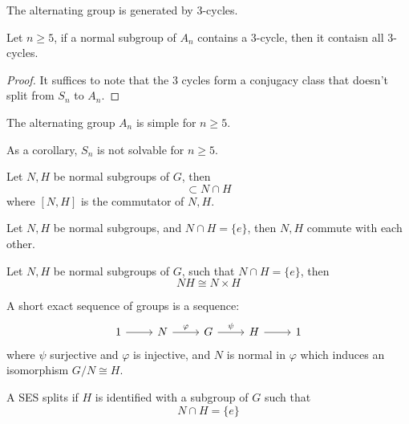 \documentclass[openany]{book}
\begin{document}
\begin{prop}
    The alternating group is generated by $3$-cycles.
\end{prop}

\begin{prop}
    Let $n\geq 5$, if a normal subgroup of $A_n$ contains a $3$-cycle, then it contaisn all $3$-cycles.
\end{prop}
\begin{proof}
    It suffices to note that the $3$ cycles form a conjugacy class that doesn't split from $S_n$ to $A_n$.
\end{proof}
\begin{thm}
    The alternating group $A_n$ is simple for $n\geq 5$.

    As a corollary, $S_n$ is not solvable for $n\geq 5$.
\end{thm}


\begin{prop}
    Let $N,H$ be normal subgroups of $G$, then 
    \begin{equation*}
        [N,H]\subset N\cap H
    \end{equation*}
    where $[N,H]$ is the commutator of $N,H$.
\end{prop}

\begin{prop}[*]
    Let $N,H$ be normal subgroups, and $N\cap H=\{e\}$, then $N,H$ commute with each other.
\end{prop}

\begin{thm}
    Let $N,H$ be normal subgroups of $G$, such that $N\cap H=\{e\}$, then 
    \begin{equation*}
        NH\cong N\times H
    \end{equation*}
\end{thm}


\begin{defn}
    A short exact sequence of groups is a sequence:
    \[\begin{tikzcd}
        1 & N & G & H & 1
        \arrow[from=1-1, to=1-2]
        \arrow["\varphi", from=1-2, to=1-3]
        \arrow["\psi", from=1-3, to=1-4]
        \arrow[from=1-4, to=1-5]
    \end{tikzcd}\]
    where $\psi$ surjective and $\varphi$ is injective, and $N$ is normal in $\varphi$ which induces an isomorphism $G/N\cong H$.

    A SES splits if $H$ is identified with a subgroup of $G$ such that 
    \begin{equation*}
        N\cap H=\{e\}
    \end{equation*}
\end{defn}
\end{document}
